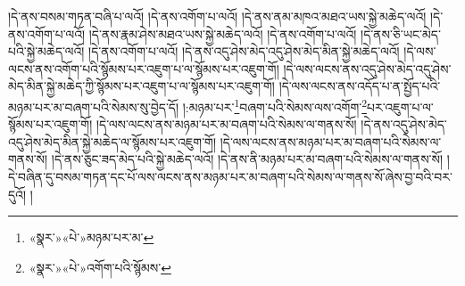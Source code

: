 །དེ་ནས་བསམ་གཏན་བཞི་པ་ལའོ། །དེ་ནས་འགོག་པ་ལའོ། །དེ་ནས་ནམ་མཁའ་མཐའ་ཡས་སྐྱེ་མཆེད་ལའོ། །དེ་ནས་འགོག་པ་ལའོ། །དེ་ནས་རྣམ་ཤེས་མཐའ་ཡས་སྐྱེ་མཆེད་ལའོ། །དེ་ནས་འགོག་པ་ལའོ། །དེ་ནས་ཅི་ཡང་མེད་པའི་སྐྱེ་མཆེད་ལའོ། །དེ་ནས་འགོག་པ་ལའོ། །དེ་ནས་འདུ་ཤེས་མེད་འདུ་ཤེས་མེད་མིན་སྐྱེ་མཆེད་ལའོ། །དེ་ལས་ལངས་ནས་འགོག་པའི་སྙོམས་པར་འཇུག་པ་ལ་སྙོམས་པར་འཇུག་གོ། །དེ་ལས་ལངས་ནས་འདུ་ཤེས་མེད་འདུ་ཤེས་མེད་མིན་སྐྱེ་མཆེད་ཀྱི་སྙོམས་པར་འཇུག་པ་ལ་སྙོམས་པར་འཇུག་གོ། །དེ་ལས་ལངས་ནས་འདོད་པ་ན་སྤྱོད་པའི་མཉམ་པར་མ་བཞག་པའི་སེམས་སུ་བྱེད་དོ། །:མཉམ་པར་\footnote{«སྣར་»«པེ་»མཉམ་པར་མ་}བཞག་པའི་སེམས་ལས་འགོག་\footnote{«སྣར་»«པེ་»འགོག་པའི་སྙོམས་}པར་འཇུག་པ་ལ་སྙོམས་པར་འཇུག་གོ། །དེ་ལས་ལངས་ནས་མཉམ་པར་མ་བཞག་པའི་སེམས་ལ་གནས་སོ། །དེ་ནས་འདུ་ཤེས་མེད་འདུ་ཤེས་མེད་མིན་སྐྱེ་མཆེད་ལ་སྙོམས་པར་འཇུག་གོ། །དེ་ལས་ལངས་ནས་མཉམ་པར་མ་བཞག་པའི་སེམས་ལ་གནས་སོ། །དེ་ནས་ཅུང་ཟད་མེད་པའི་སྐྱེ་མཆེད་ལའོ། །དེ་ནས་ནི་མཉམ་པར་མ་བཞག་པའི་སེམས་ལ་གནས་སོ། །དེ་བཞིན་དུ་བསམ་གཏན་དང་པོ་ལས་ལངས་ནས་མཉམ་པར་མ་བཞག་པའི་སེམས་ལ་གནས་སོ་ཞེས་བྱ་བའི་བར་དུའོ། །
